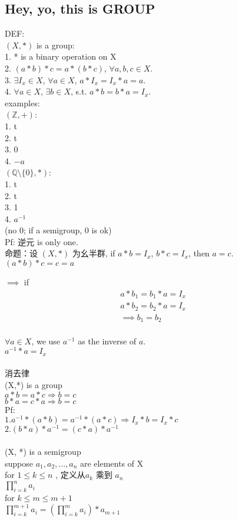 \documentclass[12pt, a4paper]{article}  %
\begin{document}
\subsection{Hey, yo, this is GROUP}
DEF:\\
\((X,*)\) is a group:\\
1. * is a binary operation on X\\
2. \((a * b) * c = a * (b * c)\), \(\forall a, b, c \in X\).\\
3. \(\exists I_x \in X\), \(\forall a \in X\), \(a * I_x = I_x * a = a\).\\
4. \(\forall a \in X\), \(\exists b \in X\), s.t. \(a * b = b * a = I_x\).\\
examples:\\
\((\mathbb{Z}, +)\): \\
1. t\\
2. t\\
3. 0\\
4. \(-a\)\\
\((\mathbb{Q} \setminus \{0\}, *)\):\\
1. t\\
2. t\\
3. 1\\
4. \(a^{-1}\)\\
(no 0; if a semigroup, 0 is ok)\\
Pf: 逆元 is only one.\\
命题：设 \((X,*)\) 为幺半群, if \(a * b = I_x\), \(b * c = I_x\), then \(a = c\).\\
\((a * b) * c = c = a\)

\(\implies\) if
\begin{gather}
    a * b_1 = b_1 * a = I_x \\
    a * b_2 = b_2 * a = I_x \\
    \implies b_1 = b_2
\end{gather}
\\
\(\forall a \in X\), we use \(a^{-1}\) as the inverse of \(a\).\\
\(a^{-1} * a = I_x\)
\\
\\
消去律\\
(X,*) is a group\\
\(a*b=a*c \Rightarrow  b=c\)\\
\(b*a=c*a \Rightarrow  b=c\)
\\
Pf:\\
\(1. a^{-1}*(a*b)=a^{-1}*(a*c) \Rightarrow I_x*b=I_x*c\)\\
\(2. (b*a)*a^{-1}=(c*a)*a^{-1}\)
\\
\\
(X, *) is a semigroup\\
suppose \(a_1 , a_2 , ... , a_n\) are elements of X\\
for \(1\leqslant k\leqslant n\) , 定义从\(a_k\) 乘到 \(a_n\)\\
\(\prod_{i=k}^{n} a_i\)\\
for \(k \leqslant m \leqslant m+1\)\\
\(\prod_{i=k}^{m+1} a_i =(\prod_{i=k}^{m} a_i)*a_{m+1}\)\\
\end{document}
